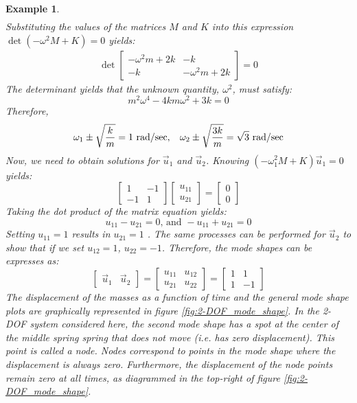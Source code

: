\documentclass[12pt,letter]{article}
\newtheorem{ex}{Example}
\numberwithin{ex}{section} %
\newenvironment{example}{\begin{mdframed}[middlelinewidth=0.5mm]\begin{ex}\normalfont}{\end{ex}\end{mdframed}}
\numberwithin{re}{section} %
\begin{document}
\begin{example}
\begin{eqnarray}
\end{eqnarray}
Substituting the values of the matrices $M$ and $K$ into this expression $\det(-\omega^2 M  + K) = 0$ yields: 
\begin{eqnarray}
\det\begin{bmatrix} -\omega^2 m + 2k & -k  \\  -k & -\omega^2 m + 2k \end{bmatrix}=0
\end{eqnarray}
The determinant yields that the unknown quantity, $\omega^2$, must satisfy:
\begin{equation}
m^2 \omega^4 - 4km\omega^2 + 3k = 0
\end{equation}
Therefore, 
\begin{equation}
\omega_1 \pm \sqrt{\frac{k}{m}}=1 \text{ rad/sec}, \hspace{2ex} \omega_2 \pm \sqrt{\frac{3k}{m}}=\sqrt{3} \text{ rad/sec}
\end{equation}
Now, we need to obtain solutions for $\vec{u}_1$ and $\vec{u}_2$. Knowing $(-\omega_1^2 M  + K)\vec{u}_1 =0$ yields:
\begin{equation}
	 \begin{bmatrix} 1 & -1 \\    -1  & 1 \end{bmatrix} 
	 \begin{bmatrix} u_{11}\\ u_{21}\end{bmatrix}=\begin{bmatrix} 0\\ 0\end{bmatrix}
\end{equation}
Taking the dot product of the matrix equation yields:
\begin{equation}
	u_{11} - u_{21}=0 \text{, and } - u_{11} + u_{21}=0
\end{equation}
Setting $u_{11} = 1$ results in $u_{21} = 1$ . The same processes can be performed for $\vec{u}_2$ to show that if we set $u_{12} = 1$, $u_{22} = -1$. Therefore, the mode shapes can be expresses as:
\begin{equation}
	 \begin{bmatrix} \vec{u}_1 & \vec{u}_2 \end{bmatrix} = \begin{bmatrix}  u_{11} & u_{12} \\ u_{21} & u_{22} \end{bmatrix} = \begin{bmatrix}  1 & 1 \\ 1 & -1 \end{bmatrix}
\end{equation}
The displacement of the masses as a function of time and the general mode shape plots are graphically represented in figure \ref{fig:2-DOF_mode_shape}. In the 2-DOF system considered here, the second mode shape has a spot at the center of the middle spring spring that does not move (i.e. has zero displacement). This point is called a node. Nodes correspond to points in the mode shape where the displacement is always zero. Furthermore, the displacement of the node points remain zero at all times, as diagrammed in the top-right of figure \ref{fig:2-DOF_mode_shape}.


\end{example}
\end{document}
